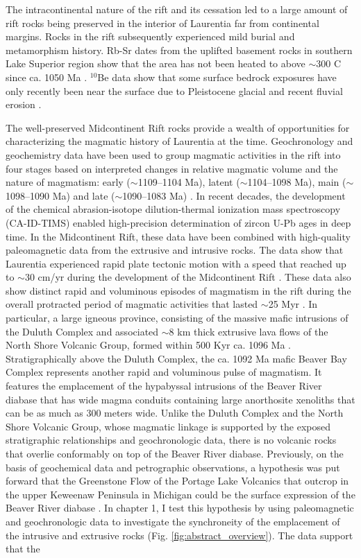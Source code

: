 The intracontinental nature of the rift and its cessation led to a large amount of rift rocks being preserved in the interior of Laurentia far from continental margins. Rocks in the rift subsequently experienced mild burial and metamorphism history. Rb-Sr dates from the uplifted basement rocks in southern Lake Superior region show that the area has not been heated to above $\sim$300 \textdegree C since ca. 1050 Ma \citep{Cannon1993a}. $^{10}$Be data show that some surface bedrock exposures have only recently been near the surface due to Pleistocene glacial and recent fluvial erosion \cite[e.g.][]{Ullman2015a}. 

The well-preserved Midcontinent Rift rocks provide a wealth of opportunities for characterizing the magmatic history of Laurentia at the time. Geochronology and geochemistry data have been used to group magmatic activities in the rift into four stages based on interpreted changes in relative magmatic volume and the nature of magmatism: early ($\sim$1109--1104 Ma), latent ($\sim$1104--1098 Ma), main ($\sim$1098--1090 Ma) and late ($\sim$1090--1083 Ma) \citep{Vervoort2007a, Heaman2007a, Miller2013a}. In recent decades, the development of the chemical abrasion-isotope dilution-thermal ionization mass spectroscopy (CA-ID-TIMS) enabled high-precision determination of zircon U-Pb ages in deep time. In the Midcontinent Rift, these data have been combined with high-quality paleomagnetic data from the extrusive and intrusive rocks. The data show that Laurentia experienced rapid plate tectonic motion with a speed that reached up to $\sim$30 cm/yr during the development of the Midcontinent Rift \citep{Swanson-Hysell2019a, Rose2022a}. These data also show distinct rapid and voluminous episodes of magmatism in the rift during the overall protracted period of magmatic activities that lasted $\sim$25 Myr \citep{Swanson-Hysell2019a, Swanson-Hysell2021a, Zhang2021b}. In particular, a large igneous province, consisting of the massive mafic intrusions of the Duluth Complex and associated $\sim$8 km thick extrusive lava flows of the North Shore Volcanic Group, formed within 500 Kyr ca. 1096 Ma \citep{Swanson-Hysell2021a}. Stratigraphically above the Duluth Complex, the ca. 1092 Ma mafic Beaver Bay Complex represents another rapid and voluminous pulse of magmatism. It features the emplacement of the hypabyssal intrusions of the Beaver River diabase that has wide magma conduits containing large anorthosite xenoliths that can be as much as 300 meters wide. Unlike the Duluth Complex and the North Shore Volcanic Group, whose magmatic linkage is supported by the exposed stratigraphic relationships and geochronologic data, there is no volcanic rocks that overlie conformably on top of the Beaver River diabase. Previously, on the basis of geochemical data and petrographic observations, a hypothesis was put forward that the Greenstone Flow of the Portage Lake Volcanics that outcrop in the upper Keweenaw Peninsula in Michigan could be the surface expression of the Beaver River diabase \citep{Doyle2016a}. In chapter 1, I test this hypothesis by using paleomagnetic and geochronologic data to investigate the synchroneity of the emplacement of the intrusive and extrusive rocks (Fig. \ref{fig:abstract_overview}). The data support that the 